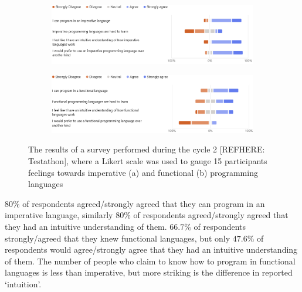 \begin{figure}[ht]
    \begin{subfigure}{\textwidth}
        \centering
        \includegraphics[width=\linewidth]{images/imperative_likert.png}
        \caption{}
        \label{fig:imp_is_easy}
    \end{subfigure}
    
    \begin{subfigure}{\textwidth}
        \centering
        \includegraphics[width=\linewidth]{images/fp_likert.png}
        \caption{}
        \label{fig:fp_is_hard}
    \end{subfigure}
    \caption{The results of a survey performed during the cycle 2 [REFHERE: Testathon], where a Likert scale was used to gauge 15 participants feelings towards imperative (a) and functional (b) programming languages}
\end{figure}

 $80\%$ of respondents agreed/strongly agreed that they can program in an imperative language, similarly $80\%$ of respondents agreed/strongly agreed that they had an intuitive understanding of them. $66.7\%$ of respondents strongly/agreed that they knew functional languages, but only $47.6\%$ of respondents would agree/strongly agree that they had an intuitive understanding of them.
The number of people who claim to know how to program in functional languages is less than imperative, but more striking is the difference in reported `intuition'. 


